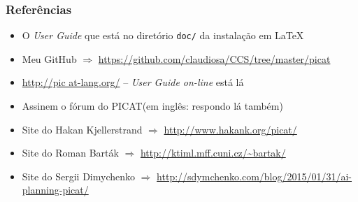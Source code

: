 
\begin{frame}
    \frametitle{Referências}
    \begin{itemize}
    \item O \textit{User Guide} que está no diretório  \texttt{doc/} da instalação em \LaTeX
    
     \item Meu GitHub $\Rightarrow $  \url{https://github.com/claudiosa/CCS/tree/master/picat}

     \item \url{http://pic at-lang.org/} -- \textit{User Guide on-line} está lá
    
    \item Assinem o fórum do PICAT(em inglês: respondo lá também)

    \item Site do Hakan  Kjellerstrand  $\Rightarrow $ \url{http://www.hakank.org/picat/}
    \item Site do Roman Barták  $\Rightarrow $ 	\url{http://ktiml.mff.cuni.cz/~bartak/}
    \item Site do Sergii Dimychenko  $\Rightarrow $ \url{http://sdymchenko.com/blog/2015/01/31/ai-planning-picat/}
    
    \end{itemize}
\end{frame}

